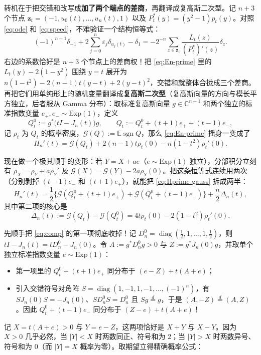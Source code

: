 \documentclass[UTF8,fontset=windows,a4paper,11pt]{ctexart}
\newcommand{\C}{\mathbb{C}}
\newcommand{\E}{\mathbb{E}}
\newcommand{\G}{\mathcal{G}}
\newcommand{\sgn}{\operatorname{sgn}}
\begin{document}
转机在于把交错和改写成\textbf{加了两个端点的差商}，再翻译成复高斯二次型。记 $n+3$ 个节点 $\boldsymbol{z}_t=(-1,u_0(t),\dots,u_n(t),1)$ 以及 $P_t^*(y)=(y^2-1)p_t(y)$。对照 \eqref{eq:ode} 和 \eqref{eq:speed}，不难验证一个结构恒等式：
\[
    (-1)^{n+1}\delta_{-1}+2\sum_{j=0}^{n}\varepsilon_j\delta_{u_j(t)}-\delta_1
    = -2^{-n}\sum_{z\in\boldsymbol{z}_t}\frac{L_t(z)}{(P_t^*)'(z)}\delta_z.
\]
右边的系数恰好是 $n+3$ 个节点上的差商权！把 \eqref{eq:En-prime} 里的 $L_t(y)-2(1-y^2)$ 围绕 $y=t$ 展开为 $n(1-t^2)-2(n-1)t(y-t)+2(y-t)^2$，交错和就整体合拢成三个差商。再把它们用单纯形上的随机变量翻译成\textbf{复高斯二次型}（复高斯向量的方向与模长平方独立，后者服从 Gamma 分布）：取标准复高斯向量 $g\in\C^{n+1}$ 和两个独立的标准指数变量 $e_+,e_-\sim\mathrm{Exp}(1)$，定义
\[
    Q_t^0 := g^*\bigl(tI-J_n(t)\bigr)g,
    \qquad
    Q_t := Q_t^0 + (t+1)e_+ + (t-1)e_-,
\]
记 $\rho_t$ 为 $Q_t$ 的概率密度，$\G(Q):=\E\sgn Q$，那么 \eqref{eq:En-prime} 摇身一变成了
\begin{equation}
    H_n'(t) = \G(Q_t) + 2(n-1)t\rho_t(0) - n(1-t^2)\rho_t'(0).
    \label{eq:Hprime-gauss}
\end{equation}

现在做一个极其顺手的变形：若 $Y=X+ae$（$e\sim\mathrm{Exp}(1)$ 独立），分部积分立刻有 $\rho_X=\rho_Y+a\rho_Y'$ 及 $\G(X)=\G(Y)-2a\rho_Y(0)$。把这条恒等式连续用两次（分别剥掉 $(t-1)e_-$ 和 $(t+1)e_+$），就能把 \eqref{eq:Hprime-gauss} 拆成两半：
\begin{equation}
    H_n'(t)
    = \frac12\bigl\{\G(Q_t^0+(t+1)e_+)+\G(Q_t^0+(t-1)e_-)\bigr\}
    + \frac{n}{2}\Delta_n(t),
    \label{eq:comp}
\end{equation}
其中第二项的核心是
\begin{equation}
    \Delta_n(t) := \G(Q_t)-\G(Q_t^0) = 4t\rho_t(0)-2(1-t^2)\rho_t'(0).
    \label{eq:delta-def}
\end{equation}

先顺手把 \eqref{eq:comp} 的第一项彻底收掉！记 $D_n^0=\operatorname{diag}(\frac12,1,\dots,1,\frac12)$，则 $tI-J_n(t)=tD_n^0-J_n(0)$。令 $A:=g^*D_n^0 g>0$ 与 $Z:=g^*J_n(0)g$，并取单个独立标准指数变量 $e\sim\mathrm{Exp}(1)$：
\begin{itemize}
    \item 第一项里的 $Q_t^0+(t+1)e_+$ 同分布于 $(e-Z)+t(A+e)$；
    \item 引入交错符号对角阵 $S=\operatorname{diag}(1,-1,1,-1,\dots,(-1)^n)$，有 $SJ_n(0)S=-J_n(0)$、$SD_n^0 S=D_n^0$ 且 $Sg\overset{d}{=}g$，于是 $(A,-Z)\overset{d}{=}(A,Z)$。因此 $Q_t^0+(t-1)e_-$ 同分布于 $(Z-e)+t(A+e)$！
\end{itemize}
记 $X=t(A+e)>0$ 与 $Y=e-Z$，这两项恰好是 $X+Y$ 与 $X-Y$。因为 $X>0$ 几乎必然，当 $|Y|<X$ 时两数同正、符号和为 $2$；当 $|Y|>X$ 时两数异号、符号和为 $0$（而 $|Y|=X$ 概率为零）。取期望立得精确概率公式：
\end{document}

